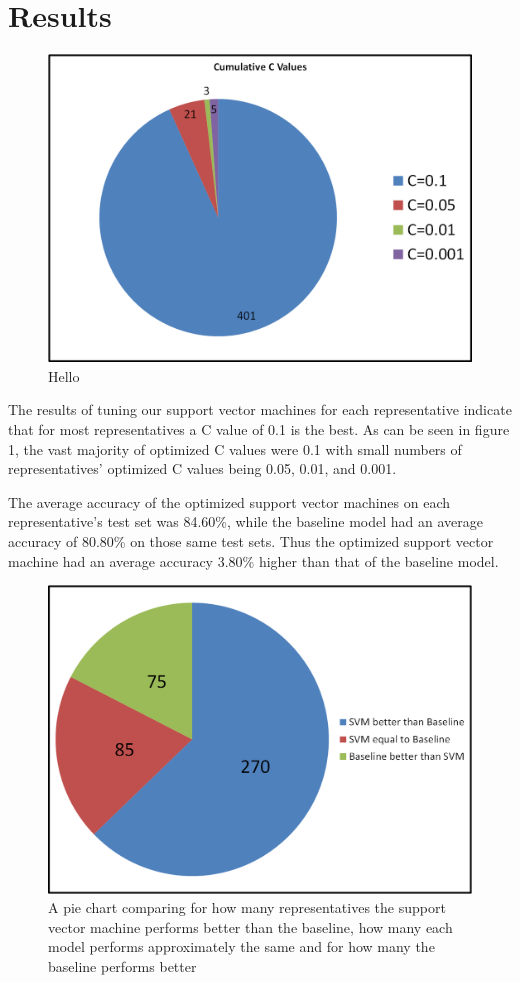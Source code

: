 \documentclass[11pt,letterpaper,twocolumn]{article}
\begin{document}
\section{Results}

\begin{figure}
\includegraphics[width=\columnwidth]{c_values.png}
\caption{Hello}
\end{figure}

The results of tuning our support vector machines for each representative indicate that for most representatives a C value of 0.1 is the best. As can be seen in figure 1, the vast majority of optimized C values were 0.1 with small numbers of representatives' optimized C values being 0.05, 0.01, and 0.001.

The average accuracy of the optimized support vector machines on each representative's test set was 84.60\%, while the baseline model had an average accuracy of 80.80\% on those same test sets. Thus the optimized support vector machine had an average accuracy 3.80\% higher than that of the baseline model.

\begin{figure}
\includegraphics[width=\columnwidth]{pie_chart_1.png}
\caption{A pie chart comparing for how many representatives the support vector machine performs better than the baseline, how many each model performs approximately the same and for how many the baseline performs better}
\end{figure}
\end{document}

